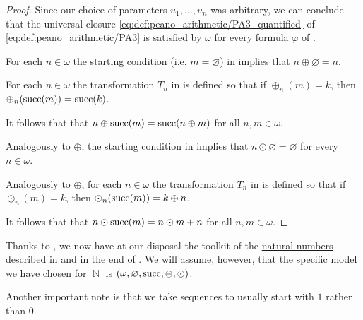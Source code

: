 \begin{proof}
  Since our choice of parameters \( u_1, \ldots, u_n \) was arbitrary, we can conclude that the universal closure \eqref{eq:def:peano_arithmetic/PA3_quantified} of \eqref{eq:def:peano_arithmetic/PA3} is satisfied by \( \omega \) for every formula \( \varphi \) of .

   For each \( n \in \omega \) the starting condition (i.e. \( m = \varnothing \)) in  implies that \( n \oplus \varnothing = n \).

   For each \( n \in \omega \) the transformation \( T_n \) in  is defined so that if \( \oplus_n(m) = k \), then \( \oplus_n(\operatorname{succ}(m)) = \operatorname{succ}(k) \).

  It follows that that \( n \oplus \operatorname{succ}(m) = \operatorname{succ}(n \oplus m) \) for all \( n, m \in \omega \).

   Analogously to \( \oplus \), the starting condition in  implies that \( n \odot \varnothing = \varnothing \) for every \( n \in \omega \).

   Analogously to \( \oplus \), for each \( n \in \omega \) the transformation \( T_n \) in  is defined so that if \( \odot_n(m) = k \), then \( \odot_n(\operatorname{succ}(m)) = k \oplus n \).

  It follows that that \( n \odot \operatorname{succ}(m) = n \odot m + n \) for all \( n, m \in \omega \).
\end{proof}

\begin{remark}\label{rem:natural_number_availability_zfc}
  Thanks to , we now have at our disposal the toolkit of the \hyperref[def:natural_numbers]{natural numbers} described in  and in the end of . We will assume, however, that the specific model we have chosen for \( \BbbN \) is \( (\omega, \varnothing, \operatorname{succ}, \oplus, \odot) \).

  Another important note is that we take sequences to usually start with \( 1 \) rather than \( 0 \).
\end{remark}

